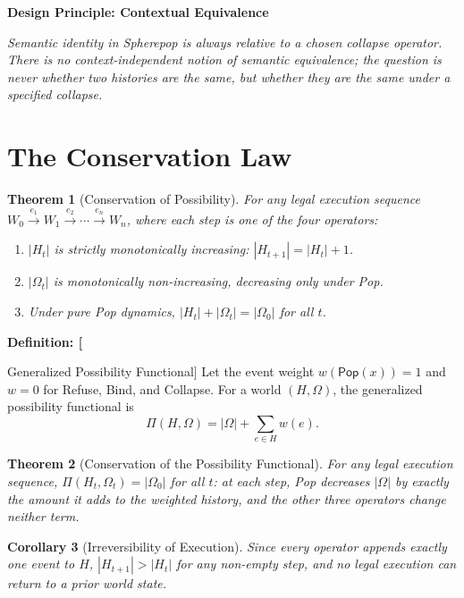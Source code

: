 \documentclass[11pt,fleqn]{book}
\numberwithin{equation}{chapter}
\newenvironment{definition}[1]
  {\begin{definitionEnv}
   \noindent\textbf{Definition: #1}\par\smallskip}
  {\end{definitionEnv}}
\newenvironment{principle}[1]
  {\begin{principleEnv}
   \noindent\textbf{Design Principle: #1}\par\smallskip\itshape}
  {\end{principleEnv}}
\theoremstyle{plain}
\newtheorem{theorem}{Theorem}[chapter]
\newtheorem{corollary}[theorem]{Corollary}
\theoremstyle{definition}
\theoremstyle{remark}
\providecommand{\Pop}{\mathsf{Pop}}
\begin{document}
\begin{principle}{Contextual Equivalence}
Semantic identity in Spherepop is always relative to a chosen collapse operator. There is no context-independent notion of semantic equivalence; the question is never whether two histories are the same, but whether they are the same under a specified collapse.
\end{principle}

\section{The Conservation Law}

\begin{theorem}[Conservation of Possibility]
For any legal execution sequence \(W_0\xrightarrow{e_1}W_1\xrightarrow{e_2}\cdots\xrightarrow{e_n}W_n\), where each step is one of the four operators:
\begin{enumerate}
\item \(|H_t|\) is strictly monotonically increasing: \(|H_{t+1}|=|H_t|+1\).
\item \(|\Omega_t|\) is monotonically non-increasing, decreasing only under Pop.
\item Under pure Pop dynamics, \(|H_t|+|\Omega_t|=|\Omega_0|\) for all \(t\).
\end{enumerate}
\end{theorem}

\begin{definition}[Generalized Possibility Functional]
Let the event weight \(w(\Pop(x))=1\) and \(w=0\) for Refuse, Bind, and Collapse. For a world \((H,\Omega)\), the generalized possibility functional is
\[
\Pi(H,\Omega) = |\Omega| + \sum_{e\in H} w(e).
\]
\end{definition}

\begin{theorem}[Conservation of the Possibility Functional]
For any legal execution sequence, \(\Pi(H_t,\Omega_t)=|\Omega_0|\) for all \(t\): at each step, Pop decreases \(|\Omega|\) by exactly the amount it adds to the weighted history, and the other three operators change neither term.
\end{theorem}

\begin{corollary}[Irreversibility of Execution]
Since every operator appends exactly one event to \(H\), \(|H_{t+1}|>|H_t|\) for any non-empty step, and no legal execution can return to a prior world state.
\end{corollary}
\end{document}
